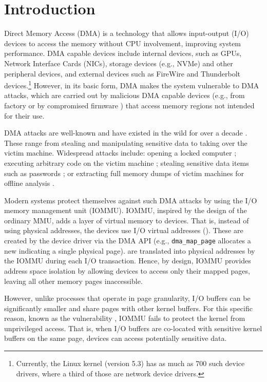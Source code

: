 \section{Introduction}

Direct Memory Access (DMA) is a technology that allows input-output (I/O) devices to access the memory without CPU involvement, improving system performance.
DMA capable devices include internal devices, such as GPUs, Network Interface Cards (NICs), storage devices (e.g., NVMe) and other peripheral devices, and external devices such as FireWire and Thunderbolt devices.\footnote{Currently, the Linux kernel (version 5.3) has as much as 700 such device drivers, where a third of those are network device drivers.} However, in its basic form, DMA makes the system vulnerable to DMA attacks, which are carried out by malicious DMA capable devices (e.g., from factory or by compromised firmware \cite{Gal14,Ben17a}) that access memory regions not intended for their use. 



DMA attacks are well-known and have existed in the wild for over a decade \cite{Dor04,BDK10,thunder}. These range from stealing and manipulating sensitive data to taking over the victim machine. Widespread attacks include: opening a locked computer \cite{MM, Fin14}; executing arbitrary code on the victim machine \cite{Fri16, Woj08, AD10,thunder}; stealing sensitive data items such as passwords \cite{SB12, LKV13, Cim16, BR12}; or extracting full memory dumps of victim machines for offline analysis \cite{MM, Vol, Fin14, GA10}. 

Modern systems protect themselves against such DMA attacks by using the I/O memory management unit (IOMMU). IOMMU, inspired by the design of the ordinary MMU, adds a layer of virtual memory to devices. That is, instead of using physical addresses, the devices use I/O virtual addresses (\iova). These \iova{} are created by the device driver via the DMA API (e.g., \texttt{dma\_map\_page} allocates a new \iova{} indicating a single physical page). \iova{} are translated into physical addresses by the IOMMU during each I/O transaction. Hence, by design, IOMMU provides address space isolation by allowing devices to access only their mapped pages, leaving all other memory pages inaccessible. 

However, unlike processes that operate in page granularity, I/O buffers can be significantly smaller and share pages with other kernel buffers. For this specific reason, known as the \subpage{} vulnerability \cite{MMT16,thunder}, IOMMU fails to protect the kernel from unprivileged access. That is, when I/O buffers are co-located with sensitive kernel buffers on the same page, devices can access potentially sensitive data. 

